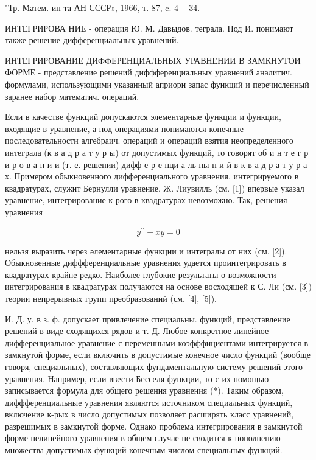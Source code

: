 \documentclass[10pt]{article}
\begin{document}
"Тр. Матем. ин-та АН СССР», 1966, т. 87, c. $4-34$.



ИНТЕГРИРОВА НИЕ - операция Ю. М. Давыдов. теграла. Под И. понимают также решение дифференциальных уравнений.



ИНТЕГРИРОВАНИЕ ДИФФЕРЕНЦИАЛЬНЫХ УРАВНЕНИИ В ЗАМКНУТОИ ФОРМЕ - представление решений диффференциальных уравнений аналитич. формулами, использующими указанный априори запас функций и перечисленный заранее набор математич. операций.



Если в качестве функций допускаются элементарные функции и функции, входящие в уравнение, а под операциями понимаются конечные последовательности алгебраич. операций и операций взятия неопределенного интеграла (к в а д р а т у р ы) от допустимых функций, то говорят об и н т е г р и р о в а н и и (т. е. решении) дифф е р е нци а ль ны н и й в к в а д р а т у р а х. Примером обыкновенного дифференциального уравнения, интегрируемого в квадратурах, служит Бернулли уравнение. Ж. Лиувилль (см. [1]) впервые указал уравнение, интегрирование к-рого в квадратурах невозможно. Так, решения уравнения



\[

y^{\prime \prime}+x y=0

\]



нельзя выразить через әлементарные функции и интегралы от них (см. [2]). Обыкновенные диффференциальные уравнения удается проинтегрировать в квадратурах крайне редко. Наиболее глубокие результаты о возможности интегрирования в квадратурах получаются на основе восходящей к С. Ли (см. [3]) теории непрерывных групп преобразований (см. [4], [5]).



И. Д. у. в з. ф. допускает привлечение специальны. функций, представление решений в виде сходящихся рядов и т. Д. Любое конкретное линейное дифференциальное уравнение с переменными коэфффициентами интегрируется в замкнутой форме, если включить в допустимые конечное число функций (вообще говоря, специальных), составляющих фундаментальную систему решений этого уравнения. Например, если ввести Бесселя функции, то с их помощью записывается формула для общего решения уравнения (*). Таким образом, диффференциальные уравнения являются источником специальных функций, включение к-рых в число допустимых позволяет расширять класс уравнений, разрешимых в замкнутой форме. Однако проблема интегрирования в замкнутой форме нелинейного уравнения в общем случае не сводится к пополнению множества допустимых функций конечным числом специальных функций.
\end{document}
